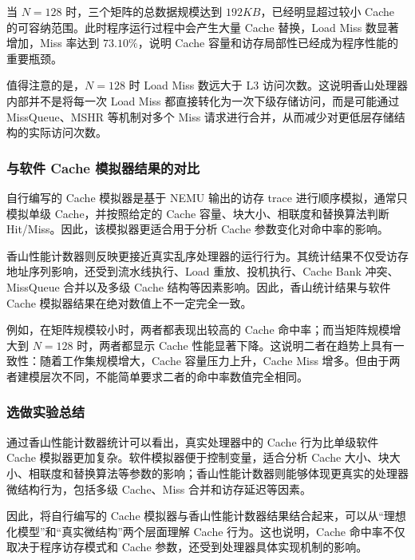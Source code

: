 当 $N=128$ 时，三个矩阵的总数据规模达到 $192KB$，已经明显超过较小 Cache 的可容纳范围。此时程序运行过程中会产生大量 Cache 替换，Load Miss 数显著增加，Miss 率达到 $73.10\%$，说明 Cache 容量和访存局部性已经成为程序性能的重要瓶颈。

值得注意的是，$N=128$ 时 Load Miss 数远大于 L3 访问次数。这说明香山处理器内部并不是将每一次 Load Miss 都直接转化为一次下级存储访问，而是可能通过 MissQueue、MSHR 等机制对多个 Miss 请求进行合并，从而减少对更低层存储结构的实际访问次数。

\subsubsection{与软件 Cache 模拟器结果的对比}

自行编写的 Cache 模拟器是基于 NEMU 输出的访存 trace 进行顺序模拟，通常只模拟单级 Cache，并按照给定的 Cache 容量、块大小、相联度和替换算法判断 Hit/Miss。因此，该模拟器更适合用于分析 Cache 参数变化对命中率的影响。

香山性能计数器则反映更接近真实乱序处理器的运行行为。其统计结果不仅受访存地址序列影响，还受到流水线执行、Load 重放、投机执行、Cache Bank 冲突、MissQueue 合并以及多级 Cache 结构等因素影响。因此，香山统计结果与软件 Cache 模拟器结果在绝对数值上不一定完全一致。

例如，在矩阵规模较小时，两者都表现出较高的 Cache 命中率；而当矩阵规模增大到 $N=128$ 时，两者都显示 Cache 性能显著下降。这说明二者在趋势上具有一致性：随着工作集规模增大，Cache 容量压力上升，Cache Miss 增多。但由于两者建模层次不同，不能简单要求二者的命中率数值完全相同。

\subsubsection{选做实验总结}

通过香山性能计数器统计可以看出，真实处理器中的 Cache 行为比单级软件 Cache 模拟器更加复杂。软件模拟器便于控制变量，适合分析 Cache 大小、块大小、相联度和替换算法等参数的影响；香山性能计数器则能够体现更真实的处理器微结构行为，包括多级 Cache、Miss 合并和访存延迟等因素。

因此，将自行编写的 Cache 模拟器与香山性能计数器结果结合起来，可以从“理想化模型”和“真实微结构”两个层面理解 Cache 行为。这也说明，Cache 命中率不仅取决于程序访存模式和 Cache 参数，还受到处理器具体实现机制的影响。